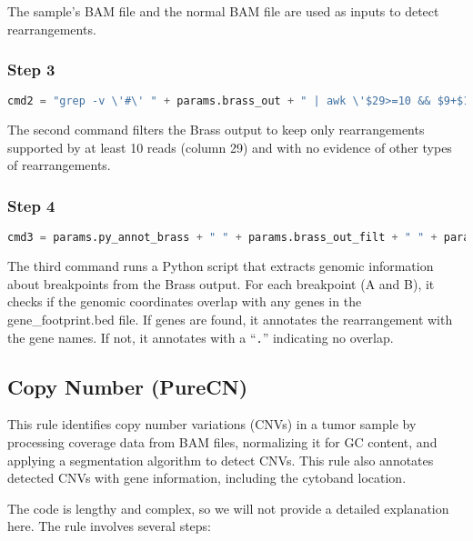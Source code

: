 The sample's BAM file and the normal BAM file are used as inputs to detect rearrangements.

\subsubsection*{Step 3}

\begin{lstlisting}[breaklines=true, language=python]
    cmd2 = "grep -v \'#\' " + params.brass_out + " | awk \'$29>=10 && $9+$10+$11+$12+$13+$14+$15+$16+$17+$18+$19+$20+$21+$22+$23+$24+$25+$26+$27+$28==0 {print $0}\' >" + params.brass_out_filt
\end{lstlisting}

The second command filters the Brass output to keep only rearrangements supported by at least 10 reads (column 29) and with no evidence of other types of rearrangements.

\subsubsection*{Step 4}

\begin{lstlisting}[breaklines=true, language=python]
    cmd3 = params.py_annot_brass + " " + params.brass_out_filt + " " + params.gene_footprints + " " + output.brass_final
\end{lstlisting}

The third command runs a Python script that extracts genomic information about breakpoints from the Brass output. For each breakpoint (A and B), it checks if the genomic coordinates overlap with any genes in the gene\_footprint.bed file. If genes are found, it annotates the rearrangement with the gene names. If not, it annotates with a “\texttt{.}” indicating no overlap.

\subsection{Copy Number (PureCN)}

This rule identifies copy number variations (CNVs) in a tumor sample by processing coverage data from BAM files, normalizing it for GC content, and applying a segmentation algorithm to detect CNVs. This rule also annotates detected CNVs with gene information, including the cytoband location.

The code is lengthy and complex, so we will not provide a detailed explanation here. The rule involves several steps:

